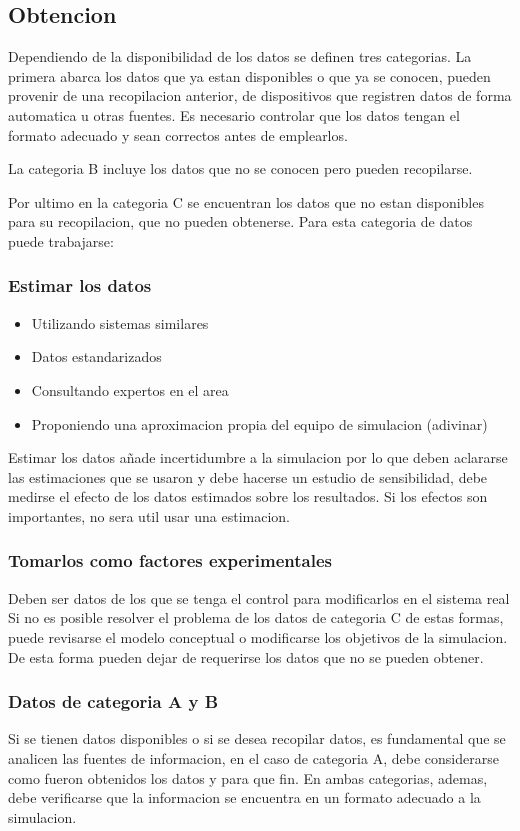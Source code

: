 \documentclass[a4paper]{article}
\begin{document}
\subsection*{Obtencion}
Dependiendo de la disponibilidad de los datos se definen tres categorias.
La primera abarca los datos que ya estan disponibles o que ya se conocen, 
pueden provenir de una recopilacion anterior, de dispositivos que registren
datos de forma automatica u otras fuentes. Es necesario controlar que 
los datos tengan el formato adecuado y sean correctos antes de emplearlos.

La categoria B incluye los datos que no se conocen pero pueden recopilarse.

Por ultimo en la categoria C se encuentran los datos que no estan disponibles 
para su recopilacion, que no pueden obtenerse.
Para esta categoria de datos puede trabajarse:
\subsubsection*{Estimar los datos}
\begin{itemize}
    \item Utilizando sistemas similares
    \item Datos estandarizados
    \item Consultando expertos en el area 
    \item Proponiendo una aproximacion propia del equipo de simulacion (adivinar)
\end{itemize}
Estimar los datos añade incertidumbre a la simulacion por lo que deben aclararse
las estimaciones que se usaron y debe hacerse un estudio de sensibilidad, debe 
medirse el efecto de los datos estimados sobre los resultados. Si los efectos son
importantes, no sera util usar una estimacion.

\subsubsection*{Tomarlos como factores experimentales}
Deben ser datos de los que se tenga el control para modificarlos en el
sistema real
Si no es posible resolver el problema de los datos de categoria C de estas formas,
puede revisarse el modelo conceptual o modificarse los objetivos de la simulacion.
De esta forma pueden dejar de requerirse los datos que no se pueden obtener.

\subsubsection*{Datos de categoria A y B}
Si se tienen datos disponibles o si se desea recopilar datos, es fundamental que
se analicen las fuentes de informacion, en el caso de categoria A, debe considerarse
como fueron obtenidos los datos y para que fin. En ambas categorias, ademas, debe
verificarse que la informacion se encuentra en un formato adecuado a la simulacion.
\end{document}
